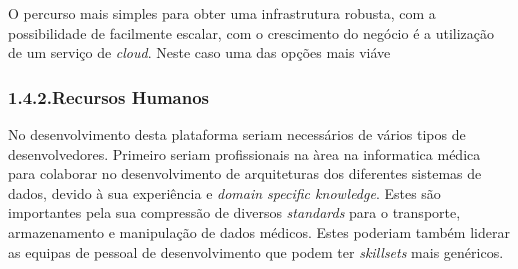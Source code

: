 \documentclass{article}
\begin{document}
\noindent{}O percurso mais simples para obter uma infrastrutura robusta, com a possibilidade de facilmente escalar, com o crescimento do negócio é a utilização de um serviço de \emph{cloud}. Neste caso uma das opções mais viáve%

\subsubsection{1.4.2.\hspace*{0.5em}Recursos Humanos}\label{sec-recursos-humanos}%

\noindent{}No desenvolvimento desta plataforma seriam necessários de vários tipos de desenvolvedores. Primeiro seriam profissionais na àrea na informatica médica para colaborar no desenvolvimento de arquiteturas dos diferentes sistemas de dados, devido à sua experiência e \emph{domain specific knowledge}. Estes são importantes pela sua compressão de diversos \emph{standards} para o transporte, armazenamento e manipulação de dados médicos. Estes poderiam também liderar as equipas de pessoal de desenvolvimento que podem ter \emph{skillsets} mais genéricos.%
\end{document}
